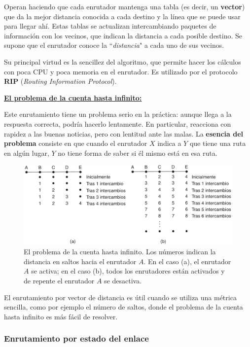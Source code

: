 \documentclass[10pt,a4paper]{article}
\begin{document}
Operan haciendo que cada enrutador mantenga una tabla (es decir, un \textbf{vector}) que da la mejor distancia conocida a cada destino y la línea que se puede usar para llegar ahí. Estas tablas se actualizan intercambiando paquetes de información con los vecinos, que indican la distancia a cada posible destino. Se supone que el enrutador conoce la ``\textit{distancia}" a cada uno de sus vecinos.

Su principal virtud es la sencillez del algoritmo, que permite hacer los cálculos con poca CPU y poca memoria en el enrutador. Es utilizado por el protocolo \textbf{RIP} (\textit{Routing Information Protocol}).

\underline{\textbf{El problema de la cuenta hasta infinito:}}

Este enrutamiento tiene un problema serio en la práctica: aunque llega a la respuesta correcta, podría hacerlo lentamente. En particular, reacciona con rapidez a las buenas noticias, pero con lentitud ante las malas. La \textbf{esencia del problema} consiste en que cuando el enrutador $X$ indica a $Y$ que tiene una ruta en algún lugar, $Y$ no tiene forma de saber si él mismo está en esa ruta.

\begin{figure}[ht!]
  \caption{El problema de la cuenta hasta infinito. Los números indican la distancia en saltos hacia el enrutador $A$. En el caso (a), el enrutador $A$ se activa; en el caso (b), todos los enrutadores están activados y de repente el enrutador $A$ se desactiva.}
  \label{fig:cuenta_infinito}
  \centerline
  {\includegraphics[width=0.9\textwidth-\fboxrule-\fboxrule]{imgs/cuenta_infinito.png}}
\end{figure}

El enrutamiento por vector de distancia es útil cuando se utiliza una métrica sencilla, como por ejemplo el número de saltos, donde el problema de la cuenta hasta infinito es más fácil de resolver.

\subsubsection{Enrutamiento por estado del enlace}
\end{document}
